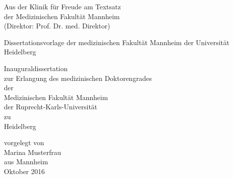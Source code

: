 \documentclass{scrreprt}
\begin{document}
\begin{titlepage}
\vspace*{\fill} %

	\begin{center}
	Aus der Klinik für Freude am Textsatz\\
	der Medizinischen Fakultät Mannheim\\
	(Direktor: Prof. Dr. med. Direktor)\\
	
	\end{center}

	\vspace{26mm}

	\begin{center}
		\begin{Large}
Dissertationsvorlage der medizinischen Fakultät Mannheim der Universität Heidelberg\\
		\end{Large}
	\end{center}

	\vspace{26mm}

	\begin{center}
	Inauguraldissertation\\
	zur Erlangung des medizinischen Doktorengrades\\
	der\\
	Medizinischen Fakultät Mannheim\\
	der Ruprecht-Karls-Universität\\ 
	zu\\
	Heidelberg\\
	\end{center}

	\vspace{30mm}

	\begin{center}
	vorgelegt von\\
	Marina Musterfrau\\
	aus Mannheim\\ 
	\bigskip
	Oktober 2016\\
	\end{center}
\end{titlepage}
\end{document}
